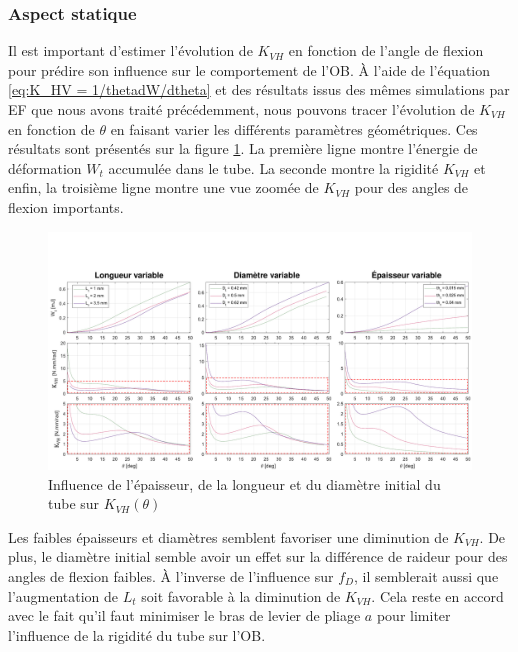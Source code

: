  		\subsubsection{Aspect statique}
Il est important d'estimer l'évolution de $K_{VH}$ en fonction de l'angle de flexion pour prédire son influence sur le comportement de l'OB. À l'aide de l'équation \ref{eq:K_HV = 1/thetadW/dtheta} et des résultats issus des mêmes simulations par EF que nous avons traité précédemment, nous pouvons tracer l'évolution de $K_{VH}$ en fonction de $\theta$ en faisant varier les différents paramètres géométriques. Ces résultats sont présentés sur la figure \ref{fig:prospection_Khv_L_R_thvar_ZOOM}. La première ligne montre l'énergie de déformation $W_t$ accumulée dans le tube. La seconde montre la rigidité $K_{VH}$ et enfin, la troisième ligne montre une vue zoomée de $K_{VH}$ pour des angles de flexion importants.  		
\begin{figure}[!htbp]
	\begin{center}
		\captionsetup{justification=centering}
		\includegraphics[trim={0cm 0cm 0cm 3cm},clip, width=\textwidth]{../Chap5/Figure/prospection_Khv_L&R&thvar_ZOOM.pdf}
		\caption{Influence de l'épaisseur, de la longueur et du diamètre initial du tube sur $K_{VH}(\theta)$}
		\label{fig:prospection_Khv_L_R_thvar_ZOOM}
	\end{center}
\end{figure} 

Les faibles épaisseurs et diamètres semblent favoriser une diminution de $K_{VH}$. De plus, le diamètre initial semble avoir un effet sur la différence de raideur pour des angles de flexion faibles. À l'inverse de l'influence sur $f_D$, il semblerait aussi que l'augmentation de $L_t$ soit favorable à la diminution de $K_{VH}$. Cela reste en accord avec le fait qu'il faut minimiser le bras de levier de pliage $a$ pour limiter l'influence de la rigidité du tube sur l'OB.

